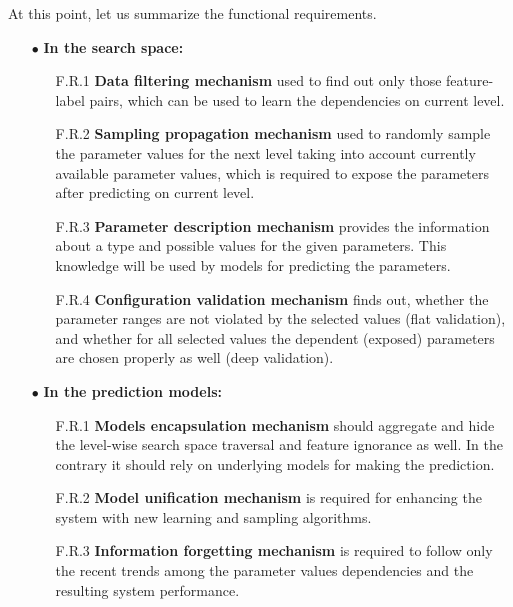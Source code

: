 At this point, let us summarize the functional requirements.
\begin{itemize}
	\item[$\bullet$] \textbf{In the search space:}
	\begin{enumerate}[itemsep=8pt]
		\item[F.R.1] \textbf{Data filtering mechanism} used to find out only those feature-label pairs, which can be used to learn the dependencies on current level.
		
		\item[F.R.2] \textbf{Sampling propagation mechanism} used to randomly sample the parameter values for  the next level taking into account currently available parameter values, which is required to expose the parameters after predicting on current level.
		
		\item[F.R.3] \textbf{Parameter description mechanism} provides the information about a type and possible values for the given parameters. This knowledge will be used by models for predicting the parameters.
		
		\item[F.R.4] \textbf{Configuration validation mechanism} finds out, whether the parameter ranges are not violated by the selected values (flat validation), and whether for all selected values the dependent (exposed) parameters are chosen properly as well (deep validation).
	\end{enumerate}

	\item[$\bullet$] \textbf{In the prediction models:}
	\begin{enumerate}[itemsep=8pt]
		\item[F.R.1] \textbf{Models encapsulation mechanism} should aggregate and hide the level-wise search space traversal and feature ignorance as well. In the contrary it should rely on underlying models for making the prediction.
		
		\item[F.R.2] \textbf{Model unification mechanism} is required for enhancing the system with new learning and sampling algorithms.
		
		\item[F.R.3] \textbf{Information forgetting mechanism} is required to follow only the recent trends among the parameter values dependencies and the resulting system performance.
	\end{enumerate}
\end{itemize}


